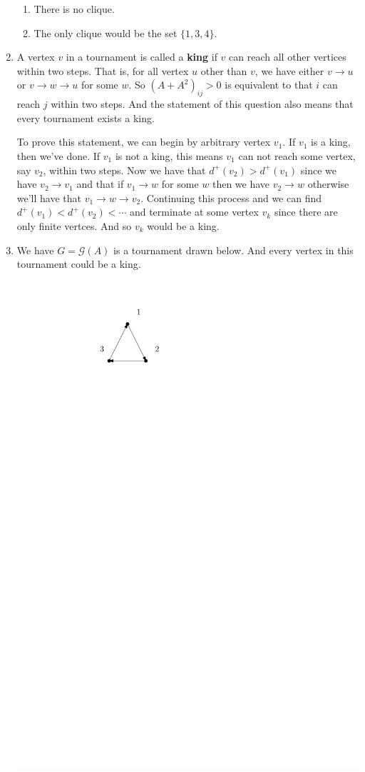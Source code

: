 \begin{enumerate}
\begin{center}
\end{center}
\begin{enumerate}
\item There is no clique.
\item The only clique would be the set $\{1,3,4\}$.
\end{enumerate}
\item A vertex $v$ in a tournament is called a \textbf{king} if $v$ can reach all other vertices within two steps. That is, for all vertex $u$ other than $v$, we have either $v\rightarrow u$ or $v\rightarrow w \rightarrow u$ for some $w$. So $(A+A^2)_{ij}>0$ is equivalent to that $i$ can reach $j$ within two steps. And the statement of this question also means that every tournament exists a king.

To prove this statement, we can begin by arbitrary vertex $v_1$. If $v_1$ is a king, then we've done. If $v_1$ is not a king, this means $v_1$ can not reach some vertex, say $v_2$, within two steps. Now we have that $d^+(v_2)>d^+(v_1)$ since we have $v_2\rightarrow v_1$ and that if $v_1\rightarrow w$ for some $w$ then we have $v_2\rightarrow w$ otherwise we'll have that $v_1\rightarrow w \rightarrow v_2$. Continuing this process and we can find $d^+(v_1)<d^+(v_2)<\cdots $ and terminate at some vertex $v_k$ since there are only finite vertces. And so $v_k$ would be a king.
\item We have $G=\mathcal{G}(A)$ is a tournament drawn below. And every vertex in this tournament could be a king.
\begin{center}
\includegraphics[scale=0.7]{2-4-22}

\end{center}
\end{enumerate}
